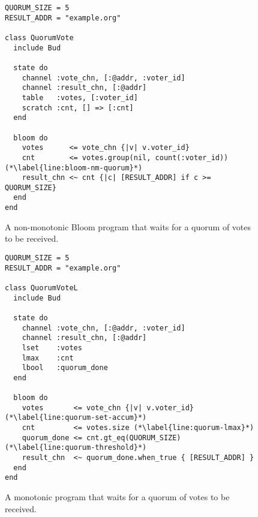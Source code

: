 \begin{figure}[t]
\begin{scriptsize}
\begin{lstlisting}
QUORUM_SIZE = 5
RESULT_ADDR = "example.org"

class QuorumVote
  include Bud

  state do
    channel :vote_chn, [:@addr, :voter_id]
    channel :result_chn, [:@addr]
    table   :votes, [:voter_id]
    scratch :cnt, [] => [:cnt]
  end

  bloom do
    votes      <= vote_chn {|v| v.voter_id}
    cnt        <= votes.group(nil, count(:voter_id)) (*\label{line:bloom-nm-quorum}*)
    result_chn <~ cnt {|c| [RESULT_ADDR] if c >= QUORUM_SIZE}
  end
end
\end{lstlisting}
\end{scriptsize}
\caption{A non-monotonic Bloom program that waits for a quorum of votes to be received.}
\label{fig:bloom-nm-quorum}
\end{figure}

\begin{figure}
\begin{scriptsize}
\begin{lstlisting}
QUORUM_SIZE = 5
RESULT_ADDR = "example.org"

class QuorumVoteL
  include Bud

  state do
    channel :vote_chn, [:@addr, :voter_id]
    channel :result_chn, [:@addr]
    lset    :votes
    lmax    :cnt
    lbool   :quorum_done
  end

  bloom do
    votes       <= vote_chn {|v| v.voter_id} (*\label{line:quorum-set-accum}*)
    cnt         <= votes.size (*\label{line:quorum-lmax}*)
    quorum_done <= cnt.gt_eq(QUORUM_SIZE) (*\label{line:quorum-threshold}*)
    result_chn  <~ quorum_done.when_true { [RESULT_ADDR] }
  end
end
\end{lstlisting}
\end{scriptsize}
\caption{A monotonic \lang program that waits for a quorum of votes to be received.}
\label{fig:lattice-quorum}
\end{figure}
